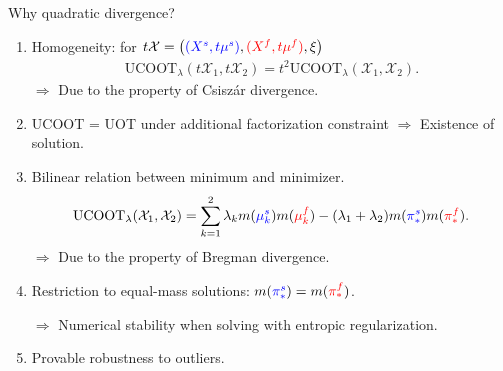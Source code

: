 \documentclass{beamer}
\newcommand{\ucoot}{\text{UCOOT}}
\newcommand{\cX}{\mathcal X}
\begin{document}
\begin{frame}{Why quadratic divergence?}
  \scriptsize
  \vspace{-1cm}
\begin{enumerate}
  \item Homogeneity:
  for $t\cX = \left({\color{blue}{(X^s, t\mu^s)}}, {\color{red}{(X^f, t\mu^f)}}, \xi \right)$
  \begin{align*}
    \ucoot_{\lambda}(t\cX_1, t\cX_2) = t^2 \ucoot_{\lambda}(\cX_1, \cX_2).
  \end{align*}
  $\Rightarrow$ Due to the property of Csiszár divergence.

  \item UCOOT = UOT under additional factorization constraint
  $\Rightarrow$ Existence of solution.

  \item Bilinear relation between minimum and minimizer.
  \begin{align*}
    \ucoot_{\lambda}(\cX_1, \cX_2) =
    \sum_{k=1}^2 \lambda_k m({\color{blue}{\mu_k^s}}) m({\color{red}{\mu_k^f}})
    - (\lambda_1 + \lambda_2) m({\color{blue}{\pi^s_*}}) m({\color{red}{\pi^f_*}}).
  \end{align*}
  $\Rightarrow$ Due to the property of Bregman divergence.

  \item Restriction to equal-mass solutions: $m({\color{blue}{\pi^s_*}}) = m({\color{red}{\pi^f_*}})$.

  $\Rightarrow$ Numerical stability when solving with entropic regularization.

  \item Provable robustness to outliers.
\end{enumerate}


\end{frame}
\end{document}
